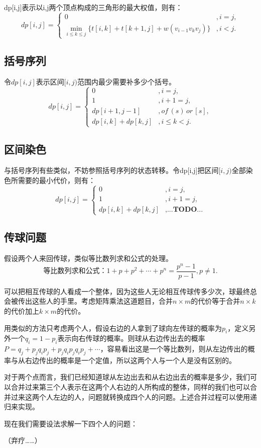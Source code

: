 \documentclass{article}
\newcommand{\romannum}[1]{\uppercase\expandafter{\romannumeral#1}}
\begin{document}
dp[i,j]表示以i,j两个顶点构成的三角形的最大权值，则有：
\begin{equation*}
    dp[i,j]=
    \begin{cases}
        0&,i=j,\\
        \min\limits_{i\le k\le j}\{t[i,k]+t[k+1,j]+w(v_{i-1}v_kv_j)\}&,i<j.
    \end{cases}
\end{equation*}
\subsection{括号序列}
令$dp[i,j]$表示区间$[i,j)$范围内最少需要补多少个括号。
\begin{equation*}
    dp[i,j]=
    \begin{cases}
        0&,i=j,\\
        1&,i+1=j,\\
        dp[i+1,j-1]&,of\,(s)\,or\,[s],\\
        dp[i,k]+dp[k,j]&,i\le k<j.
    \end{cases}
\end{equation*}
\subsection{区间染色\romannum{2}}
与括号序列有些类似，不妨参照括号序列的状态转移。令dp[i,j]把区间$[i,j)$全部染色所需要的最小代价，则有：
\begin{equation*}
    dp[i,j]=
    \begin{cases}
        0&,i=j,\\
        1&,i+1=j,\\
        dp[i,k]+dp[k,j]&,\textbf{...TODO...}
    \end{cases}
\end{equation*}
\subsection{传球问题\romannum{2}}
假设两个人来回传球，类似等比数列求和公式的处理。
\begin{equation*}
    等比数列求和公式：1+p+p^2+\cdots+p^n=\frac{p^n-1}{p-1},p\neq 1.
\end{equation*}

可以把相互传球的人看成一个整体，因为这些人无论相互传球传多少次，球最终总会被传出这些人的手里。考虑矩阵乘法这道题目，合并$n\times m$的代价等于合并$n\times k$的代价加上$k\times m$的代价。

用类似的方法只考虑两个人，假设右边的人拿到了球向左传球的概率为$p_i$，定义另外一个$q_i=1-p_i$表示向右传球的概率。则球从右边传出去的概率$P=q_j+p_jq_ip_j+p_jq_ip_jq_ip_j+\cdots$，容易看出这是一个等比数列，则从左边传出的概率与从右边传出的概率是一个定值，所以这两个人与一个人是没有区别的。

对于两个点而言，我们已经知道球从左边出去和从右边出去的概率是多少，我们可以合并过来第三个人表示在这两个人右边的人所构成的整体，同样的我们也可以合并过来这两个人左边的人，问题就转换成四个人的问题。上述合并过程可以使用递归来实现。

现在我们需要设法求解一下四个人的问题：

（弃疗……）
\end{document}
